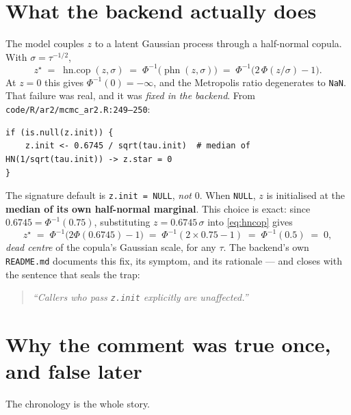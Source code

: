 \documentclass[11pt]{article}
\newcommand{\code}[1]{\texttt{#1}}
\begin{document}
\section{What the backend actually does}

The model couples $z$ to a latent Gaussian process through a half-normal
copula. With $\sigma = \tau^{-1/2}$,
\begin{equation}
  z^\star \;=\; \operatorname{hn.cop}(z, \sigma)
        \;=\; \Phi^{-1}\!\big(\operatorname{phn}(z,\sigma)\big)
        \;=\; \Phi^{-1}\!\big(2\,\Phi(z/\sigma) - 1\big).
  \label{eq:hncop}
\end{equation}
At $z = 0$ this gives $\Phi^{-1}(0) = -\infty$, and the Metropolis ratio
degenerates to \code{NaN}. That failure was real, and it was \emph{fixed in the
backend}. From \code{code/R/ar2/mcmc\_ar2.R:249--250}:

\begin{lstlisting}
if (is.null(z.init)) {
    z.init <- 0.6745 / sqrt(tau.init)  # median of HN(1/sqrt(tau.init)) -> z.star = 0
}
\end{lstlisting}

The signature default is \code{z.init = NULL}, \emph{not} $0$. When \code{NULL},
$z$ is initialised at the \textbf{median of its own half-normal marginal}. This
choice is exact: since $0.6745 = \Phi^{-1}(0.75)$, substituting
$z = 0.6745\,\sigma$ into \eqref{eq:hncop} gives
\begin{equation}
  z^\star \;=\; \Phi^{-1}\!\big(2\Phi(0.6745) - 1\big)
          \;=\; \Phi^{-1}(2 \times 0.75 - 1)
          \;=\; \Phi^{-1}(0.5) \;=\; 0 ,
\end{equation}
\emph{dead centre} of the copula's Gaussian scale, for any $\tau$. The backend's
own \code{README.md} documents this fix, its symptom, and its rationale --- and
closes with the sentence that seals the trap:

\begin{quote}
\itshape ``Callers who pass \code{z.init} explicitly are unaffected.''
\end{quote}

\section{Why the comment was true once, and false later}

The chronology is the whole story.
\end{document}
